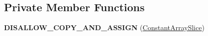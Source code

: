 \subsection*{Private Member Functions}
\begin{DoxyCompactItemize}
\item 
{\bfseries D\+I\+S\+A\+L\+L\+O\+W\+\_\+\+C\+O\+P\+Y\+\_\+\+A\+N\+D\+\_\+\+A\+S\+S\+I\+GN} (\hyperlink{structv8_1_1internal_1_1interpreter_1_1_b_a_s_e___e_m_b_e_d_d_e_d_1_1_constant_array_slice}{Constant\+Array\+Slice})\hypertarget{structv8_1_1internal_1_1interpreter_1_1_b_a_s_e___e_m_b_e_d_d_e_d_1_1_constant_array_slice_ad5a1ff8a5bba7a5b2eb406f74f788410}{}\label{structv8_1_1internal_1_1interpreter_1_1_b_a_s_e___e_m_b_e_d_d_e_d_1_1_constant_array_slice_ad5a1ff8a5bba7a5b2eb406f74f788410}

\end{DoxyCompactItemize}
